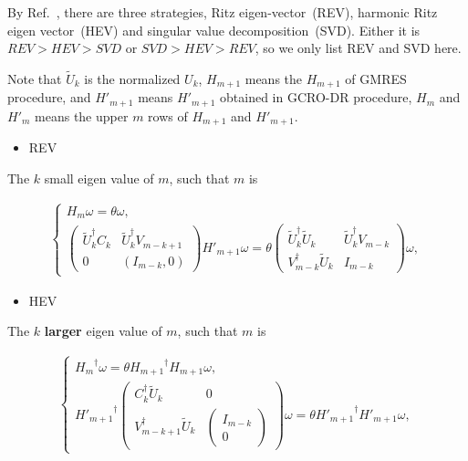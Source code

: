 By Ref.~\cite{deflation}, there are three strategies, Ritz eigen-vector~(REV), harmonic Ritz eigen vector~(HEV) and singular value decomposition~(SVD). Either it is $REV>HEV>SVD$ or $SVD>HEV>REV$, so we only list REV and SVD here.

\textcolor[rgb]{0,0,1}{Note that $\tilde{U}_k$ is the normalized $U_k$, $H_{m+1}$ means the $H_{m+1}$ of GMRES procedure, and ${H'_{m+1}}$ means ${H'_{m+1}}$ obtained in GCRO-DR procedure, $H_{m}$ and ${H'_{m}}$ means the upper $m$ rows of $H_{m+1}$ and ${H'_{m+1}}$.}

\begin{itemize}
  \item REV
\end{itemize}

The $k$ small eigen value of $m$, such that $m$ is

\begin{equation}
\begin{split}
\left\{\begin{array}{l}
H_m\omega = \theta \omega,\\
\left(\begin{array}{cc} \tilde{U}_k^{\dagger}C_k & \tilde{U}_k^{\dagger}V_{m-k+1} \\ 0 & (I_{m-k},0)\end{array}\right) H'_{m+1}\omega = \theta \left(\begin{array}{cc} \tilde{U}_k^{\dagger}\tilde{U}_{k}  & \tilde{U}_k^{\dagger}V_{m-k} \\ V_{m-k}^{\dagger}\tilde{U}_k & I_{m-k}\end{array}\right)\omega,
\end{array}\right.
\end{split}
\end{equation}

\begin{itemize}
  \item HEV
\end{itemize}

The $k$ \textbf{larger} eigen value of $m$, such that $m$ is

\begin{equation}
\begin{split}
\left\{\begin{array}{l}
{H_{m}}^{\dagger}\omega = \theta {H_{m+1}}^{\dagger}{H_{m+1}}\omega,\\
{H'_{m+1}}^{\dagger}\left(\begin{array}{cc} C_k^{\dagger}\tilde{U}_k  & 0 \\ V_{m-k+1}^{\dagger}\tilde{U}_k  & \left(\begin{array}{c}I_{m-k} \\ 0\end{array}\right)\end{array}\right)\omega = \theta {H'_{m+1}}^{\dagger}{H'_{m+1}}\omega,
\end{array}\right.
\end{split}
\end{equation}

